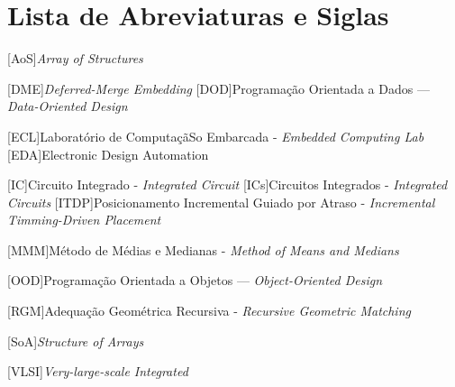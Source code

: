 \chapter * {Lista de Abreviaturas e Siglas}
\thispagestyle{empty}
\label{acro}


\begin{acronym}
\setlength{\parskip}{0ex}
\setlength{\itemsep}{1ex}


\renewcommand{\baselinestretch}{0.25}%
\large\normalsize%



[AoS]{\textit{Array of Structures}}


[DME]{\textit{Deferred-Merge Embedding}}
[DOD]{Programação Orientada a Dados --- \textit{Data-Oriented Design}}

[ECL]{Laboratório de ComputaçãSo Embarcada - \textit{Embedded Computing Lab}}
[EDA]{Electronic Design Automation}




[IC]{Circuito Integrado - \textit{Integrated Circuit}}
[ICs]{Circuitos Integrados - \textit{Integrated Circuits}}
[ITDP]{Posicionamento Incremental Guiado por Atraso - \textit{Incremental Timming-Driven Placement}}



[MMM]{Método de Médias e Medianas - \textit{Method of Means and Medians}}


[OOD]{Programação Orientada a Objetos --- \textit{Object-Oriented Design}}



[RGM]{Adequação Geométrica Recursiva - \textit{Recursive Geometric Matching}}

[SoA]{\textit{Structure of Arrays}}


[VLSI]{\textit{Very-large-scale Integrated}}





\end{acronym}
